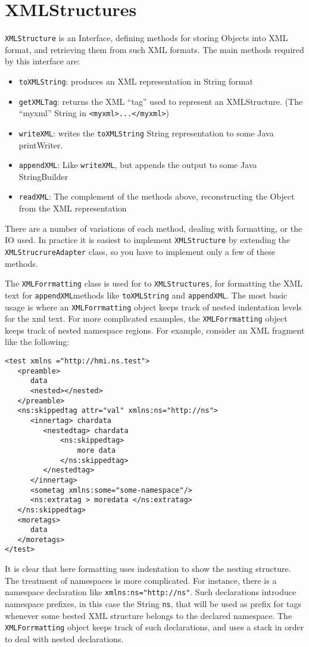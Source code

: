 \section{XMLStructures}

\verb#XMLStructure# is an Interface, defining methods for storing Objects into XML format, and retrieving them from
such XML formats. The main methods required by this interface are:

\begin{itemize}
\item \verb#toXMLString#: produces an XML representation in String format
\item \verb#getXMLTag#: returns the XML ``tag'' used to represent an XMLStructure. (The ``myxml'' String in \verb#<myxml>...</myxml>#)
\item \verb#writeXML#: writes the \verb#toXMLString# String representation to some Java printWriter.
\item \verb#appendXML#: Like \verb#writeXML#, but appends the output to some Java StringBuilder
\item \verb#readXML#: The complement of the methods above, reconstructing the Object from the XML representation
\end{itemize}

There are a number of variations of each method, dealing with formatting, or the IO used. In practice it is easiest to implement
\verb#XMLStructure# by extending the \verb#XMLStrucrureAdapter# class, so you have to implement only a few of these methods.

The \verb#XMLForrmatting# class is used for to \verb#XMLStructures#, for formatting the XML text for \verb#appendXML#methods like
\verb#toXMLString# and \verb#appendXML#. The most basic usage is where an \verb#XMLForrmatting# object keeps track of nested indentation levels
for the xml text. For more complicated examples, the \verb#XMLForrmatting# object keeps track of nested namespace regions.
 For example, consider an XML fragment like the following:
\begin{verbatim}
<test xmlns ="http://hmi.ns.test">
   <preamble>
      data
      <nested></nested>
   </preamble>
   <ns:skippedtag attr="val" xmlns:ns="http://ns">
      <innertag> chardata
         <nestedtag> chardata
             <ns:skippedtag>
                 more data
             </ns:skippedtag>
         </nestedtag>
      </innertag>
      <sometag xmlns:some="some-namespace"/>
      <ns:extratag > moredata </ns:extratag>
   </ns:skippedtag>
   <moretags>
      data
   </moretags>
</test>
\end{verbatim}
It is clear that here formatting uses indentation to show the nesting structure.
The treatment of namespaces is more complicated. For instance, there is a namespace declaration like \verb#xmlns:ns="http://ns"#.
Such declarations introduce namespace prefixes, in this case the String \verb"ns", that will be used as prefix for tags
whenever some bested XML structure belongs to the declared namespace. The \verb#XMLForrmatting# object keeps track of such declarations,
and uses a stack in order to deal with nested declarations. 

